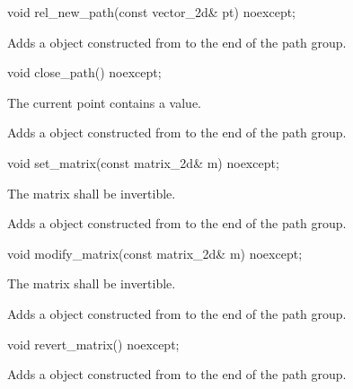 %
\begin{itemdecl}
void rel_new_path(const vector_2d& pt) noexcept;
\end{itemdecl}
\begin{itemdescr}
\pnum
\effects
Adds a  object constructed from  to the end of the path group.
\end{itemdescr}

%
\begin{itemdecl}
void close_path() noexcept;
\end{itemdecl}
\begin{itemdescr}
\pnum
\requires
The current point contains a value.

\pnum
\effects
Adds a  object constructed from  to the end of the path group.
\end{itemdescr}

%
\begin{itemdecl}
void set_matrix(const matrix_2d& m) noexcept;
\end{itemdecl}
\begin{itemdescr}
\pnum
\requires
The matrix  shall be invertible.

\pnum
\effects
Adds a  object constructed from  to the end of the path group.
\end{itemdescr}

%
\begin{itemdecl}
void modify_matrix(const matrix_2d& m) noexcept;
\end{itemdecl}
\begin{itemdescr}
\pnum
\requires
The matrix  shall be invertible.

\pnum
\effects
Adds a  object constructed from  to the end of the path group.
\end{itemdescr}

%
\begin{itemdecl}
void revert_matrix() noexcept;
\end{itemdecl}
\begin{itemdescr}
\pnum
\effects
Adds a  object constructed from  to the end of the path group.
\end{itemdescr}

